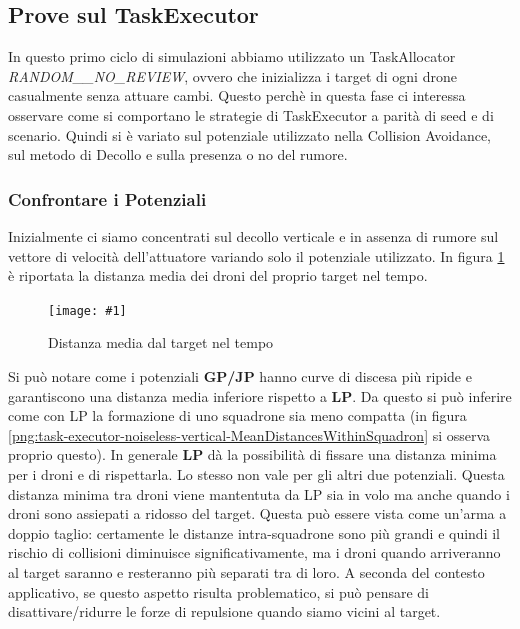 \documentclass[a4paper,11pt,oneside, table]{article}
\newcommand{\putimage}[4] {
	\begin{figure}[H]
	    \centering
	    \texttt{[image: \#1]}
	    \caption{#2}\label{#3}
	\end{figure}
}
\begin{document}
\subsection{Prove sul TaskExecutor}

In questo primo ciclo di simulazioni abbiamo utilizzato un TaskAllocator \textit{RANDOM\_\_NO\_REVIEW}, ovvero che inizializza i target di ogni drone casualmente senza attuare cambi.
Questo perch\`e in questa fase ci interessa osservare come si comportano le strategie di TaskExecutor a parit\`a di seed e di scenario.
Quindi si \`e variato sul potenziale utilizzato nella Collision Avoidance, sul metodo di Decollo e sulla presenza o no del rumore.

\subsubsection{Confrontare i Potenziali}

Inizialmente ci siamo concentrati sul decollo verticale e in assenza di rumore sul vettore di velocit\`a dell'attuatore variando solo il potenziale utilizzato.
In figura \ref{png:task-executor-noiseless-vertical-MeanDistanceFromTarget} \`e riportata la distanza media dei droni del proprio target nel tempo.

\putimage{images/experiments/task-executor-noiseless-vertical/MeanDistanceFromTarget.png}{Distanza media dal target nel tempo}{png:task-executor-noiseless-vertical-MeanDistanceFromTarget}{0.99}

Si pu\`o notare come i potenziali \textbf{GP/JP} hanno curve di discesa pi\`u ripide e garantiscono una distanza media inferiore rispetto a \textbf{LP}.
Da questo si pu\`o inferire come con LP la formazione di uno squadrone sia meno compatta (in figura \ref{png:task-executor-noiseless-vertical-MeanDistancesWithinSquadron} si osserva proprio questo).
In generale \textbf{LP} d\`a la possibilit\`a di fissare una distanza minima per i droni e di rispettarla. Lo stesso non vale per gli altri due potenziali.
Questa distanza minima tra droni viene mantentuta da LP sia in volo ma anche quando i droni sono assiepati a ridosso del target.
Questa pu\`o essere vista come un'arma a doppio taglio: certamente le distanze intra-squadrone sono pi\`u grandi e quindi il rischio di collisioni diminuisce significativamente, ma i droni quando arriveranno al target saranno e resteranno più separati tra di loro. A seconda del contesto applicativo, se questo aspetto risulta problematico, si può pensare di disattivare/ridurre le forze di repulsione quando siamo vicini al target.
\end{document}
